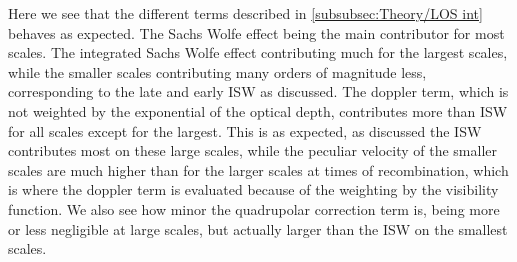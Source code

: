 \documentclass[10pt,a4paper]{article}
\begin{document}
Here we see that the different terms described in \cref{subsubsec:Theory/LOS int} behaves as expected. The Sachs Wolfe effect being the main contributor for most scales. The integrated Sachs Wolfe effect contributing much for the largest scales, while the smaller scales contributing many orders of magnitude less, corresponding to the late and early ISW as discussed. The doppler term, which is not weighted by the exponential of the optical depth, contributes more than ISW for all scales except for the largest. This is as expected, as discussed the ISW contributes most on these large scales, while the peculiar velocity of the smaller scales are much higher than for the larger scales at times of recombination, which is where the doppler term is evaluated because of the weighting by the visibility function. We also see how minor the quadrupolar correction term is, being more or less negligible at large scales, but actually larger than the ISW on the smallest scales.
\end{document}

